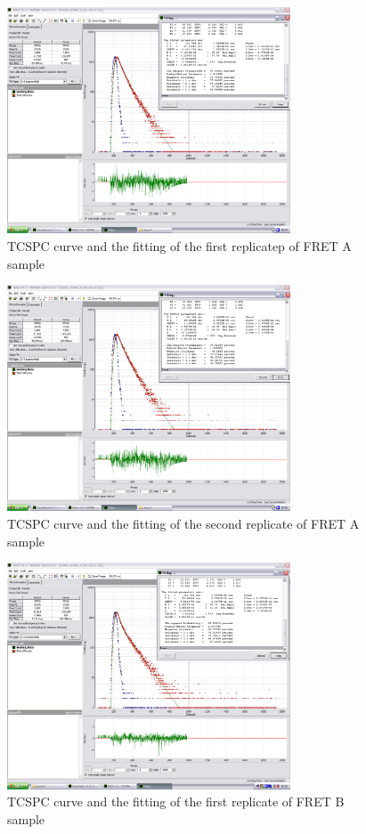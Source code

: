 \documentclass[a4paper,english,12pt,bibliography=totoc]{scrreprt}
\begin{document}
\begin{figure}
    \centering
    \includegraphics[width=0.75\textwidth]{images/FRET/FretA_dsDNA_Cy3B_data1_fit2.png}
    \caption{TCSPC curve and the fitting of the first replicatep of FRET A sample}
    \label{FretA_dsDNA_Cy3B_data1}
\end{figure}

\begin{figure}
    \centering
    \includegraphics[width=0.75\textwidth]{images/FRET/FretA_dsDNA_Cy3B_data2_fit2.png}
    \caption{TCSPC curve and the fitting of the second replicate of FRET A sample}
    \label{FretA_dsDNA_Cy3B_data2}
\end{figure}

\begin{figure}
    \centering
    \includegraphics[width=0.75\textwidth]{images/FRET/FretB_dsDNA_Cy3B_data1_fit2.png}
    \caption{TCSPC curve and the fitting of the first replicate of FRET B sample}
    \label{FretB_dsDNA_Cy3B_data1_fit2}
\end{figure}
\end{document}
